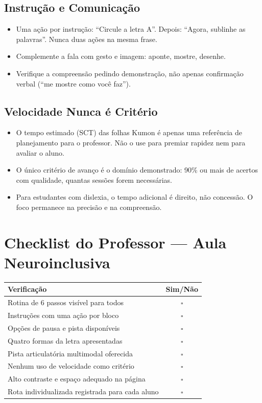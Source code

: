 \subsection{Instrução e Comunicação}

\begin{itemize}
  \item Uma ação por instrução: ``Circule a letra A''. Depois: ``Agora,
        sublinhe as palavras''. Nunca duas ações na mesma frase.
  \item Complemente a fala com gesto e imagem: aponte, mostre, desenhe.
  \item Verifique a compreensão pedindo demonstração, não apenas
        confirmação verbal (``me mostre como você faz'').
\end{itemize}

\subsection{Velocidade Nunca é Critério}

\begin{itemize}
  \item O tempo estimado (SCT) das folhas Kumon é apenas uma referência de
        planejamento para o professor. Não o use para premiar rapidez nem
        para avaliar o aluno.
  \item O único critério de avanço é o domínio demonstrado: 90\% ou mais de
        acertos com qualidade, quantas sessões forem necessárias.
  \item Para estudantes com dislexia, o tempo adicional é direito, não
        concessão. O foco permanece na precisão e na compreensão.
\end{itemize}

\section{Checklist do Professor --- Aula Neuroinclusiva}

\begin{center}
\begin{tabular}{|l|c|}
\hline
\textbf{Verificação} & \textbf{Sim/Não} \\
\hline
Rotina de 6 passos visível para todos & $\square$ \\
\hline
Instruções com uma ação por bloco & $\square$ \\
\hline
Opções de pausa e pista disponíveis & $\square$ \\
\hline
Quatro formas da letra apresentadas & $\square$ \\
\hline
Pista articulatória multimodal oferecida & $\square$ \\
\hline
Nenhum uso de velocidade como critério & $\square$ \\
\hline
Alto contraste e espaço adequado na página & $\square$ \\
\hline
Rota individualizada registrada para cada aluno & $\square$ \\
\hline
\end{tabular}
\end{center}

